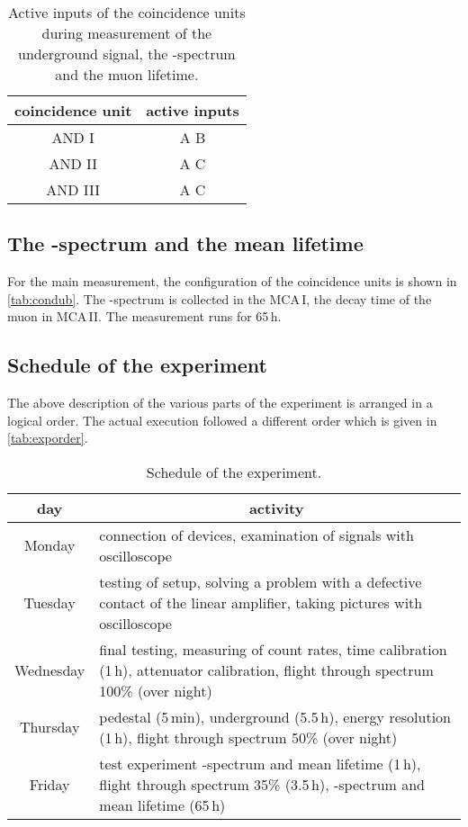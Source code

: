 \begin{table}[H]
\caption{Active inputs of the coincidence units during measurement of the underground signal,
the \textbeta-spectrum and the muon lifetime.}
\begin{center}
\begin{tabular}{|c|c|}
  \hline
  coincidence unit	& active inputs	\\ \hline\hline
  AND I				& A B			\\ \hline
  AND II			& A	C			\\ \hline
  AND III			& A C			\\ \hline
 \end{tabular}
\end{center}
\label{tab:condub}
\end{table}

\subsection{The \textbeta-spectrum and the mean lifetime}

For the main measurement, the configuration of the coincidence units is shown in \autoref{tab:condub}.
The \textbeta-spectrum is collected in the MCA\,I, the decay time of the muon in MCA\,II.
The measurement runs for 65\,h.


\subsection{Schedule of the experiment}
The above description of the various parts of the experiment is arranged in a logical order.
The actual execution followed a different order which is given in \autoref{tab:exporder}.

\begin{table}[H]
\caption{Schedule of the experiment.}
\begin{center}
\begin{tabular}{|c|p{12cm}|}
  \hline
  day				&  \multicolumn{1}{|c|}{activity} 		\\ \hline\hline
  Monday			& connection of devices, examination of signals with oscilloscope			\\ \hline
  Tuesday			& testing of setup, solving a problem with a defective contact of the linear amplifier, taking pictures with oscilloscope						\\ \hline
  Wednesday			& final testing, measuring of count rates, time calibration (1\,h), attenuator calibration, flight through spectrum 100\% (over night)				\\ \hline
  Thursday			& pedestal (5\,min), underground (5.5\,h), energy resolution (1\,h), flight through spectrum 50\% (over night)		\\ \hline
  Friday			& test experiment \textbeta-spectrum and mean lifetime (1\,h), flight through spectrum 35\% (3.5\,h), \textbeta-spectrum and mean lifetime (65\,h)			\\ \hline
 \end{tabular}
\end{center}
\label{tab:exporder}
\end{table}


